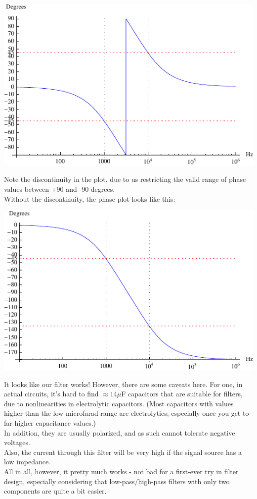 \documentclass[12pt,a4paper]{report}
\begin{document}
\includegraphics[scale=1.4]{Graphics/bsf_phase_plot}

Note the discontinuity in the plot, due to us restricting the valid range of phase values between +90 and -90 degrees.\\
Without the discontinuity, the phase plot looks like this:

\includegraphics[scale=1.4]{Graphics/bsf_phase_plot_no_disc}

It looks like our filter works! However, there are some caveats here. For one, in actual circuits, it's hard to find $\approx 14 \mu$F capacitors that are suitable for filters, due to nonlinearities in electrolytic capacitors. (Most capacitors with values higher than the low-microfarad range are electrolytics; especially once you get to far higher capacitance values.)\\
In addition, they are usually polarized, and as such cannot tolerate negative voltages.\\
Also, the current through this filter will be very high if the signal source has a low impedance.\\
All in all, however, it pretty much works - not bad for a first-ever try in filter design, especially  considering that low-pass/high-pass filters with only two components are quite a bit easier.
\end{document}
